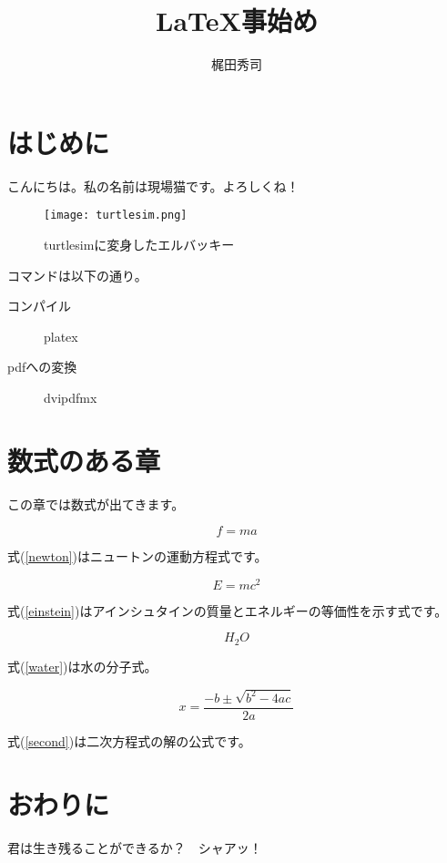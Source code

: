 \documentclass[12pt,epsf]{jarticle}
\begin{document}
\title{LaTeX事始め}
\author{梶田秀司}
\maketitle

\section{はじめに}
こんにちは。私の名前は現場猫です。よろしくね！

\begin{figure}[h]
 \centering
 \texttt{[image: turtlesim.png]}
 \caption{turtlesimに変身したエルバッキー}
 \end{figure}
 
コマンドは以下の通り。
 \begin{description}
 \item[コンパイル] platex
 \item[pdfへの変換] dvipdfmx
 \end{description}
 
 
 \section{数式のある章}
 
 この章では数式が出てきます。
 
 \begin{equation}
 f = ma     \label{newton}
 \end{equation}
 
 式(\ref{newton})はニュートンの運動方程式です。
 
 \begin{equation}
 E = mc^2   \label{einstein}
 \end{equation}
 
 式(\ref{einstein})はアインシュタインの質量とエネルギーの等価性を示す式です。
 
 \begin{equation}
 H_2 O    \label{water}
 \end{equation}
 
 式(\ref{water})は水の分子式。
 
 \begin{equation}
 x = \frac{-b\pm \sqrt{b^2 - 4ac}}{2a}   \label{second}
 \end{equation}
 
 式(\ref{second})は二次方程式の解の公式です。
 \section{おわりに}
 君は生き残ることができるか？　シャアッ！
\end{document}
